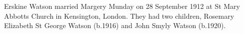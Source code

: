
Erskine Watson married Margery Munday on 28 September 1912 at St Mary Abbotts Church in	Kensington, London.
They had two children, Rosemary Elizabeth St George Watson (b.1916) and John Smyly Watson (b.1920).


